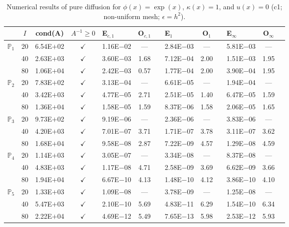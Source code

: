 \begin{table}[H]
\centering
\caption{Numerical results of pure diffusion for $\phi(x)=\exp(x)$, $\kappa(x)=1$, and $u(x)=0$ (c1; non-uniform mesh; $\epsilon=h^2$).}
\begin{tabular}{@{}l c c c l c c l c c l c c@{}}
\toprule
 & $I$ & cond(A) & $A^{-1}\geq 0$ &  E$_{c,1}$ & O$_{c,1}$ && E$_1$ & O$_1$ && E$_{\infty}$ & O$_{\infty}$\\
\midrule
\multirow{3}{*}{$\mathbb{P}_{1}$}
 & 20 & 6.54E$+$02 & $\checkmark$ & 1.16E$-$02 & --- && 2.84E$-$03 & --- && 5.81E$-$03 & ---\\
 & 40 & 2.63E$+$03 & $\checkmark$ & 3.60E$-$03 & 1.68 && 7.12E$-$04 & 2.00 && 1.51E$-$03 & 1.95\\
 & 80 & 1.06E$+$04 & $\checkmark$ & 2.42E$-$03 & 0.57 && 1.77E$-$04 & 2.00 && 3.90E$-$04 & 1.95\\
\midrule
\multirow{3}{*}{$\mathbb{P}_{2}$}
 & 20 & 7.83E$+$02 & $\checkmark$ & 3.13E$-$04 & --- && 6.61E$-$05 & --- && 1.94E$-$04 & ---\\
 & 40 & 3.42E$+$03 & $\checkmark$ & 4.77E$-$05 & 2.71 && 2.51E$-$05 & 1.40 && 6.47E$-$05 & 1.59\\
 & 80 & 1.36E$+$04 & $\checkmark$ & 1.58E$-$05 & 1.59 && 8.37E$-$06 & 1.58 && 2.06E$-$05 & 1.65\\
\midrule
\multirow{3}{*}{$\mathbb{P}_{3}$}
 & 20 & 9.73E$+$02 & $\checkmark$ & 9.19E$-$06 & --- && 2.36E$-$06 & --- && 3.83E$-$06 & ---\\
 & 40 & 4.20E$+$03 & $\checkmark$ & 7.01E$-$07 & 3.71 && 1.71E$-$07 & 3.78 && 3.11E$-$07 & 3.62\\
 & 80 & 1.68E$+$04 & $\checkmark$ & 9.58E$-$08 & 2.87 && 7.22E$-$09 & 4.57 && 1.29E$-$08 & 4.59\\
\midrule
\multirow{3}{*}{$\mathbb{P}_{4}$}
 & 20 & 1.14E$+$03 & $\checkmark$ & 3.05E$-$07 & --- && 3.34E$-$08 & --- && 8.37E$-$08 & ---\\
 & 40 & 4.83E$+$03 & $\checkmark$ & 1.17E$-$08 & 4.71 && 2.58E$-$09 & 3.69 && 6.62E$-$09 & 3.66\\
 & 80 & 1.94E$+$04 & $\checkmark$ & 6.67E$-$10 & 4.13 && 1.48E$-$10 & 4.12 && 3.86E$-$10 & 4.10\\
\midrule
\multirow{3}{*}{$\mathbb{P}_{5}$}
 & 20 & 1.33E$+$03 & $\checkmark$ & 1.09E$-$08 & --- && 3.78E$-$09 & --- && 1.25E$-$08 & ---\\
 & 40 & 5.47E$+$03 & $\checkmark$ & 2.10E$-$10 & 5.69 && 4.83E$-$11 & 6.29 && 1.54E$-$10 & 6.34\\
 & 80 & 2.22E$+$04 & $\checkmark$ & 4.69E$-$12 & 5.49 && 7.65E$-$13 & 5.98 && 2.53E$-$12 & 5.93\\
\bottomrule
\end{tabular}
\end{table}